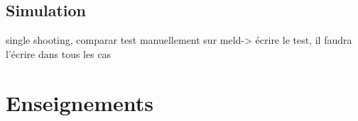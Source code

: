         

        \section{Simulation}
        
single shooting, comparar test manuellement sur meld-> écrire le test, il faudra l'écrire dans tous les cas
                
        
    \chapter{Enseignements}
    


